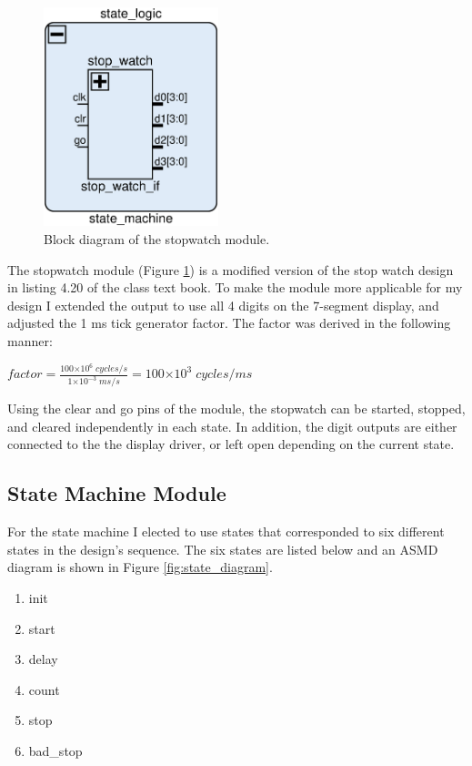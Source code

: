 \documentclass[11pt]{article}
\providecommand{\e}[1]{\ensuremath{\times 10^{#1}}}
\begin{document}
\begin{figure}[H]
\includegraphics [width=2in]{stopwatch.eps}
	\centering
	\caption{Block diagram of the stopwatch module.}
	\label{fig:stopwatchmod}
\end{figure}

The stopwatch module (Figure \ref{fig:stopwatchmod}) is a modified version of the stop watch design in listing 4.20 of the class text book. To make the module more applicable for my design I extended the output to use all 4 digits on the 7-segment display, and adjusted the 1 ms tick generator factor. The factor was derived in the following manner:

\begin{center}
    $factor = \frac{100\e{6}\; cycles/s}{1\e{-3}\; ms/s} = 100\e{3}\; cycles/ms$
\end{center}
Using the clear and go pins of the module, the stopwatch can be started, stopped, and cleared independently in each state. In addition, the digit outputs are either connected to the the display driver, or left open depending on the current state.

\subsection{State Machine Module}
For the state machine I elected to use states that corresponded to six different states in the design's sequence. The six states are listed below and an ASMD diagram is shown in Figure \ref{fig:state_diagram}.

\begin{enumerate}
    \item init
    \item start
    \item delay
    \item count
    \item stop
    \item bad\_stop
\end{enumerate}
\end{document}
